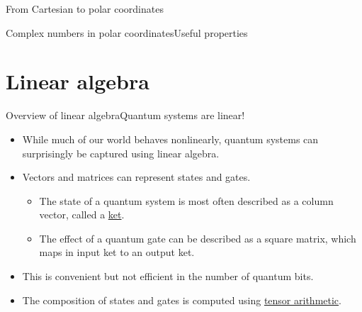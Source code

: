 \begin{frame}{From Cartesian to polar coordinates}
\end{frame}

\begin{frame}{Complex numbers in polar coordinates}{Useful properties}
    
\end{frame}
\section{Linear algebra}

\begin{frame}{Overview of linear algebra}{Quantum systems are linear!}
\begin{itemize}
    \item While much of our world behaves nonlinearly, quantum systems can surprisingly be captured using linear algebra.
    \item Vectors and matrices can represent states and gates.  
    \begin{itemize}
        \item The state of a quantum system is most often described as a column vector, called a \href{https://en.wikipedia.org/wiki/Bra-ket_notation}{ket}.
         \item The effect of a quantum gate can be described as a square matrix, which maps in input ket to an output ket.
    \end{itemize}
    \item This is convenient but not efficient in the number of quantum bits.
    \item The composition of states and gates is computed using \href{https://en.wikipedia.org/wiki/Tensor}{tensor arithmetic}.
\end{itemize}
    
\end{frame}

